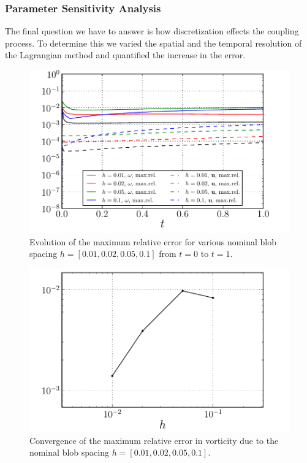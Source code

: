 \subsubsection{Parameter Sensitivity Analysis}
\label{subsubsec:psa}

The final question we have to answer is how discretization effects the coupling process. To determine this we varied the spatial and the temporal resolution of the Lagrangian method and quantified the increase in the error. 

	\begin{figure}[!b]
	\centering
	\includegraphics[width=0.6\linewidth]{./figures/validation/lambOseen/lambOseen_parameter_h.pdf}
	\caption{Evolution of the maximum relative error for various nominal blob spacing $h = [0.01,0.02,0.05,0.1]$ from $t=0$ to $t=1$.} %
	\label{fig:lambOseen_parameter_h}
	\end{figure}

	\begin{figure}[!p]
	\centering
	\includegraphics[width=0.6\linewidth]{./figures/validation/lambOseen/lambOseen_parameter_h_Trend.pdf}
	\caption{Convergence of the maximum relative error in vorticity due to the nominal blob spacing $h = [0.01,0.02,0.05,0.1]$.}
	\label{fig:lambOseen_parameter_h_Trend}
	\end{figure}
	
